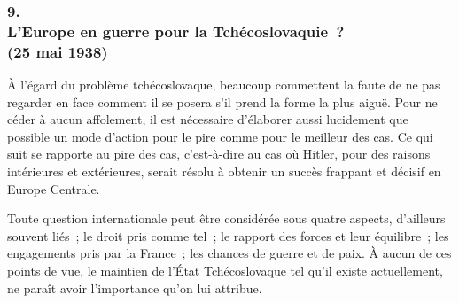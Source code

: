 \documentclass[french,twoside]{book} %
\begin{document}
\begin{center}
\end{center}
\subsubsection[9. L’Europe en guerre pour la Tchécoslovaquie ? (25 mai 1938)]{9. \\
L’Europe en guerre pour la Tchécoslovaquie ? \\
(25 mai 1938)}
\noindent \par
À l'égard du problème tchécoslovaque, beaucoup commettent la faute de ne pas regarder en face comment il se posera s'il prend la forme la plus aiguë. Pour ne céder à aucun affolement, il est nécessaire d'élaborer aussi lucidement que possible un mode d'action pour le pire comme pour le meilleur des cas. Ce qui suit se rapporte au pire des cas, c'est-à-dire au cas où Hitler, pour des raisons intérieures et extérieures, serait résolu à obtenir un succès frappant et décisif en Europe Centrale.\par
Toute question internationale peut être considérée sous quatre aspects, d'ailleurs souvent liés ; le droit pris comme tel ; le rapport des forces et leur équilibre ; les engagements pris par la France ; les chances de guerre et de paix. À aucun de ces points de vue, le maintien de l'État Tchécoslovaque tel qu'il existe actuellement, ne paraît avoir l'importance qu'on lui attribue.\par
\end{document}

